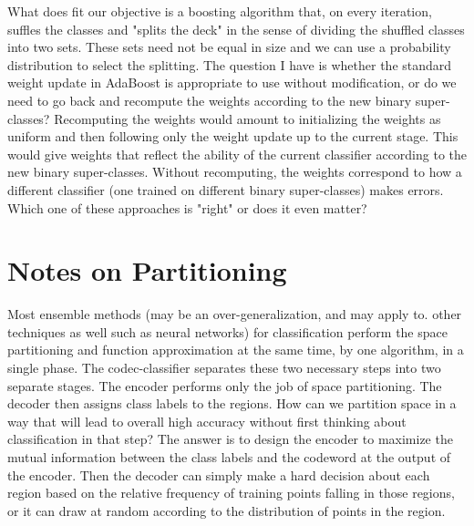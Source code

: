 \documentclass{article}
\begin{document}
What does fit our objective is a boosting algorithm that, on every iteration, suffles the classes and "splits the deck" in the sense of dividing the shuffled classes into two sets.  These sets need not be equal in size and we can use a probability distribution to select the splitting.  The question I have is whether the standard weight update in AdaBoost is appropriate to use without modification, or do we need to go back and recompute the weights according to the new binary super-classes?  Recomputing the weights would amount to initializing the weights as uniform and then following only the weight update up to the current stage.  This would give weights that reflect the ability of the current classifier according to the new binary super-classes.  Without recomputing, the weights correspond to how a different classifier (one trained on different binary super-classes) makes errors.  Which one of these approaches is "right" or does it even matter?

\section{Notes on Partitioning}

Most ensemble methods (may be an over-generalization, and may apply to. other techniques as well such as neural networks) for classification perform the space partitioning and function approximation at the same time, by one algorithm, in a single phase.  The codec-classifier separates these two necessary steps into two separate stages.  The encoder performs only the job of space partitioning.  The decoder then assigns class labels to the regions.  How can we partition space in a way that will lead to overall high accuracy without first thinking about classification in that step?  The answer is to design the encoder to maximize the mutual information between the class labels and the codeword at the output of the encoder.  Then the decoder can simply make a hard decision about each region based on the relative frequency of training points falling in those regions, or it can draw at random according to the distribution of points in the region.
\end{document}

